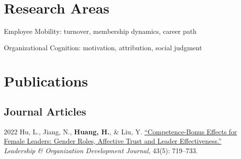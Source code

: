 \documentclass[12pt,letterpaper]{report} %
\newcommand{\listitemspace}{0.2em}
\renewenvironment{itemize}
{\begin{list}{}{\setlength{\leftmargin}{0em}
                \setlength{\parskip}{0em}
                \setlength{\itemsep}{\listitemspace}
                \setlength{\parsep}{\listitemspace}}}
{\end{list}}
\begin{document}






    \section*{Research Areas}

    \begin{itemize}

        \item Employee Mobility: turnover, membership dynamics, career path
        \item Organizational Cognition: motivation, attribution, social judgment

    \end{itemize}


    \section*{Publications}

    \subsection*{Journal Articles}

    \begin{tablist}

        \item[2022]\tab{}Hu, L., Jiang, N., \textbf{Huang, H.}, \& Liu, Y. \href{https://doi.org/10.1108/LODJ-06-2021-0312}{\enquote{Competence-Bonus Effects for Female Leaders: Gender Roles, Affective Trust and Leader Effectiveness.}} \textit{Leadership \& Organization Development Journal}, 43(5): 719--733. 

    \end{tablist}
\end{document}

